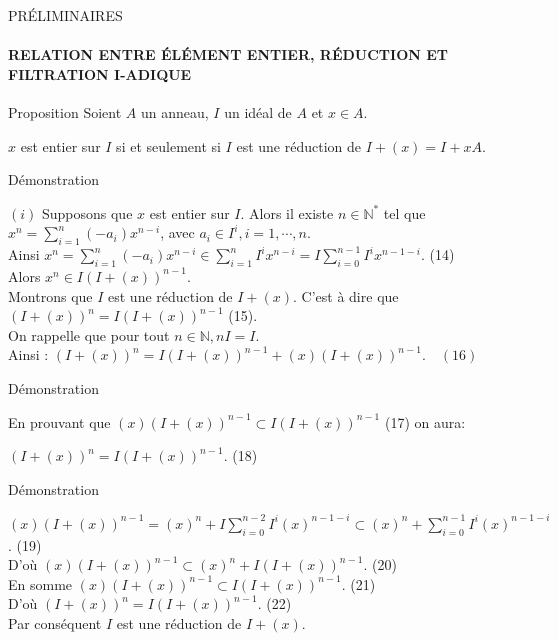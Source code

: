 \documentclass[11pt,a4paper]{beamer}
\begin{document}
		\begin{frame}{PRÉLIMINAIRES}
		\framesubtitle{RELATION ENTRE ÉLÉMENT ENTIER, RÉDUCTION ET FILTRATION I-ADIQUE}
		\begin{block}{Proposition}
				Soient $A$ un anneau, $I$ un idéal de $A$ et $x \in A$.
				\begin{center}
					$x$ est entier sur $I$ si et seulement si $I$ est une réduction de $I + (x) = I +xA $.
				\end{center}
		\end{block}
	\end{frame}
			\begin{frame}{Démonstration}
		\begin{block}{}
	$(i)$ Supposons que $x$ est entier sur $I$. Alors il existe $n \in \mathbb{N^*}$ tel que $x^n = \displaystyle \sum_{i=1}^{n}{(-a_i) x^{n-i}}$, avec $a_i \in I^i, i=1, \cdots ,n$.\\ Ainsi $x^n = \displaystyle \sum_{i=1}^{n}{(-a_i) x^{n-i}} \in \displaystyle \sum_{i=1}^{n}{I^i x^{n-i}} = I \displaystyle \sum_{i=0}^{n-1}{I^i x^{n-1-i}} $. (14)\\ Alors $ x^n \in I(I+(x))^{n-1}.$\\
	Montrons que $I$ est une réduction de $I + (x)$. C'est à dire que $(I+(x))^{n} = I(I+(x))^{n-1}$ (15).\\ On rappelle que pour tout $n \in \mathbb{N}, nI = I.$\\
	Ainsi : $(I+(x))^n = I(I+(x))^{n-1} + (x)(I+(x))^{n-1}. \quad (16)$
		\end{block}
	\end{frame}

	
			\begin{frame}{Démonstration}
		\begin{block}{}
			En prouvant que $(x)(I+(x))^{n-1} \subset I(I+(x))^{n-1}$ (17) on aura:
			\begin{center}
				$(I+(x))^n = I(I+(x))^{n-1}$. (18)
			\end{center}
		\end{block}
	\end{frame}
	\begin{frame}{Démonstration}
		\begin{block}{}
			$(x)(I+(x))^{n-1} = (x)^n + I\displaystyle \sum_{i=0}^{n-2}{I^i (x)^{n-1-i}} \subset (x)^n + \displaystyle \sum_{i=0}^{n-1}{I^i (x)^{n-1-i}}$. (19)\\
			D'où $(x)(I+(x))^{n-1} \subset (x)^n + I(I+(x))^{n-1}.$ (20)\\
			En somme $(x)(I+(x))^{n-1} \subset I(I+(x))^{n-1}.$ (21) \\ D'où $ (I+(x))^{n} = I(I+(x))^{n-1}$. (22)\\
			Par conséquent $I$ est une réduction de $I + (x)$.
		\end{block}
	\end{frame}
	
\end{document}
